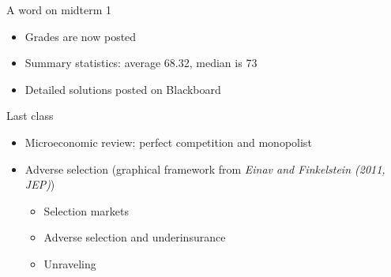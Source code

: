 \begin{frame}{A word on midterm 1}

    \begin{itemize}
        \item Grades are now posted
        \item Summary statistics: average 68.32, median is 73
        \item Detailed solutions posted on Blackboard
    \end{itemize}
\end{frame}
\begin{frame}{Last class}

    \begin{itemize}
        \item Microeconomic review: perfect competition and monopolist
        \item Adverse selection {\footnotesize {\color{gray} (graphical framework from \textit{Einav and Finkelstein (2011, JEP)})}}
        \begin{itemize}
            \item Selection markets
            \item Adverse selection and underinsurance
            \item Unraveling
        \end{itemize}
    \end{itemize}
\end{frame}
